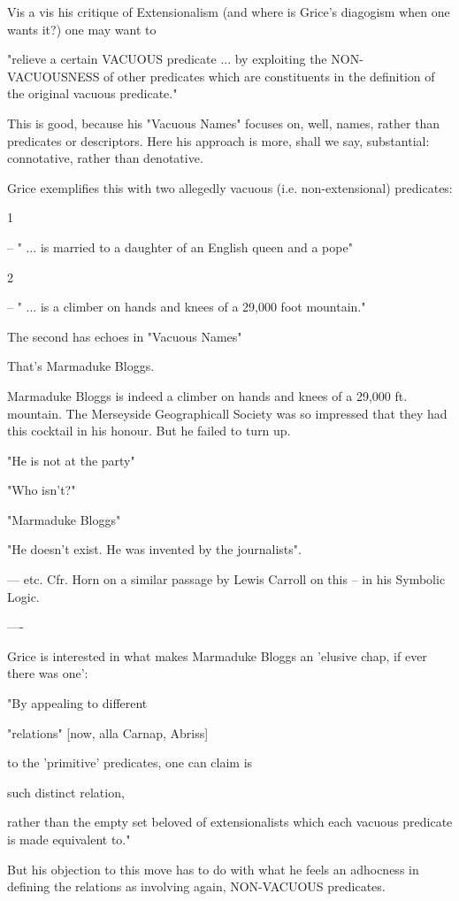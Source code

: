 \documentclass[10pt,titlepage]{book}
\begin{document}
Vis a vis his critique of Extensionalism (and where is Grice's
diagogism when one wants it?) one may want to

"relieve a certain VACUOUS predicate ... by exploiting the
NON-VACUOUSNESS of other predicates which are constituents in the
definition of the original vacuous predicate."

This is good, because his "Vacuous Names" focuses on, well, names,
rather than predicates or descriptors. Here his approach is more, shall
we say, substantial: connotative, rather than denotative.

Grice exemplifies this with two allegedly vacuous (i.e.
non-extensional) predicates:

1

-- " ... is married to a daughter of an English queen and a pope"


2

-- " ... is a climber on hands and knees of a 29,000 foot mountain."


The second has echoes in "Vacuous Names"

That's Marmaduke Bloggs.

Marmaduke Bloggs is indeed a climber on hands and knees of a 29,000 ft.
mountain. The Merseyside Geographicall Society was so impressed that
they had this cocktail in his honour. But he failed to turn up.

"He is not at the party"

"Who isn't?"

"Marmaduke Bloggs"

"He doesn't exist. He was invented by the journalists".

--- etc. Cfr. Horn on a similar passage by Lewis Carroll on this -- in
his Symbolic Logic.

----

Grice is interested in what makes Marmaduke Bloggs an 'elusive chap, if
ever there was one':

"By appealing to different

"relations" [now, alla Carnap, Abriss]

to the 'primitive' predicates, one can claim is

such distinct relation,

rather than the empty set beloved of extensionalists
which each vacuous predicate is made equivalent to."

But his objection to this move has to do with what he feels an
adhocness in defining the relations as involving again, NON-VACUOUS
predicates.
\end{document}
